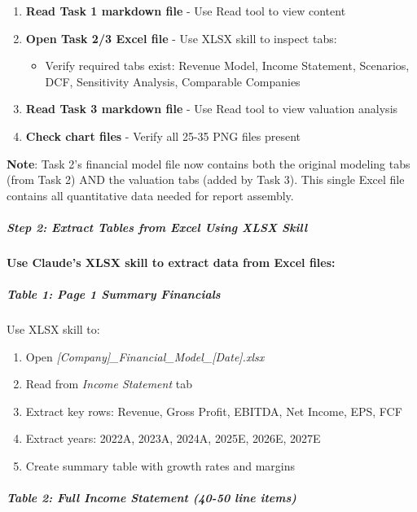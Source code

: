 \documentclass[11pt]{article}
\begin{document}
\begin{enumerate}[leftmargin=*,itemsep=2pt,topsep=2pt]
\item {} \textbf{Read Task 1 markdown file} - Use Read tool to view content
\item {} \textbf{Open Task 2/3 Excel file} - Use XLSX skill to inspect tabs:
\begin{itemize}[leftmargin=*,itemsep=2pt,topsep=2pt]
\item {} Verify required tabs exist: Revenue Model, Income Statement, Scenarios, DCF, Sensitivity Analysis, Comparable Companies
\end{itemize}
\item {} \textbf{Read Task 3 markdown file} - Use Read tool to view valuation analysis
\item {} \textbf{Check chart files} - Verify all 25-35 PNG files present
\end{enumerate}

\textbf{Note}: Task 2's financial model file now contains both the original modeling tabs (from Task 2) AND the valuation tabs (added by Task 3). This single Excel file contains all quantitative data needed for report assembly.


\subparagraph{Step 2: Extract Tables from Excel Using XLSX Skill}\mbox{}\par

\textbf{Use Claude's XLSX skill to extract data from Excel files:}


\subparagraph{Table 1: Page 1 Summary Financials}\mbox{}\par

Use XLSX skill to:

\begin{enumerate}[leftmargin=*,itemsep=2pt,topsep=2pt]
\item {} Open \emph{[Company]\_\allowbreak{}Financial\_\allowbreak{}Model\_\allowbreak{}[Date].xlsx}
\item {} Read from \emph{Income Statement} tab
\item {} Extract key rows: Revenue, Gross Profit, EBITDA, Net Income, EPS, FCF
\item {} Extract years: 2022A, 2023A, 2024A, 2025E, 2026E, 2027E
\item {} Create summary table with growth rates and margins
\end{enumerate}

\subparagraph{Table 2: Full Income Statement (40-50 line items)}\mbox{}\par
\end{document}
